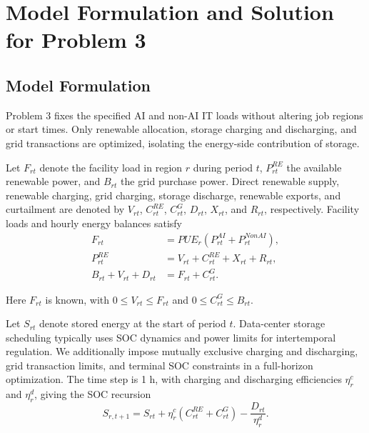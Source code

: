 \section{Model Formulation and Solution for Problem 3}

\subsection{Model Formulation}

Problem 3 fixes the specified AI and non-AI IT loads without altering job regions or start times. Only renewable allocation, storage charging and discharging, and grid transactions are optimized, isolating the energy-side contribution of storage.

Let $F_{rt}$ denote the facility load in region $r$ during period $t$,
$P^{RE}_{rt}$ the available renewable power,
and $B_{rt}$ the grid purchase power.
Direct renewable supply, renewable charging, grid charging, storage discharge,
renewable exports, and curtailment are denoted by
$V_{rt}$, $C^{RE}_{rt}$, $C^G_{rt}$,
$D_{rt}$, $X_{rt}$, and $R_{rt}$, respectively.
Facility loads and hourly energy balances satisfy
\begin{equation}
	\begin{aligned}
		F_{rt}
		&=
		PUE_r
		\left(
		P^{AI}_{rt}+P^{NonAI}_{rt}
		\right),\\
		P^{RE}_{rt}
		&=
		V_{rt}+C^{RE}_{rt}+X_{rt}+R_{rt},\\
		B_{rt}+V_{rt}+D_{rt}
		&=
		F_{rt}+C^G_{rt}.
	\end{aligned}
	\label{eq:q3_energy_balance}
\end{equation}

Here $F_{rt}$ is known, with $0\leq V_{rt}\leq F_{rt}$ and $0\leq C^G_{rt}\leq B_{rt}$.

Let $S_{rt}$ denote stored energy at the start of period $t$. Data-center storage scheduling typically uses SOC dynamics and power limits for intertemporal regulation\cite{ref10}. We additionally impose mutually exclusive charging and discharging, grid transaction limits, and terminal SOC constraints in a full-horizon optimization.
The time step is 1 h, with charging and discharging efficiencies $\eta_r^c$ and $\eta_r^d$,
giving the SOC recursion
\begin{equation}
	S_{r,t+1}
	=
	S_{rt}
	+
	\eta_r^c
	\left(
	C^{RE}_{rt}+C^G_{rt}
	\right)
	-
	\frac{D_{rt}}{\eta_r^d}.
	\label{eq:q3_soc}
\end{equation}

